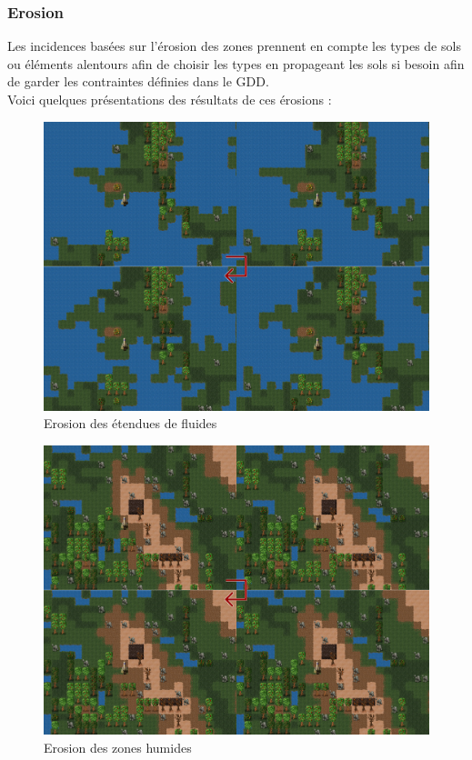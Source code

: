 \documentclass[a4paper]{article}
\newcommand{\alinea}{\hspace*{0.5cm}}
\begin{document}
        \subsubsection{Erosion}
          \alinea Les incidences basées sur l'érosion des zones prennent en compte les types de sols ou éléments alentours afin de choisir les types en propageant les sols si besoin afin de garder les contraintes définies dans le GDD.\\
          \alinea Voici quelques présentations des résultats de ces érosions :\\
          \begin{figure}
            \begin{center}
              \includegraphics[scale=0.2]{img/ErodeFluid.png}
            \end{center}
            \caption{Erosion des étendues de fluides}
          \end{figure}
          \begin{figure}
            \begin{center}
              \includegraphics[scale=0.2]{img/ErodeNearFluid.png}
            \end{center}
            \caption{Erosion des zones humides}
          \end{figure}
\end{document}
